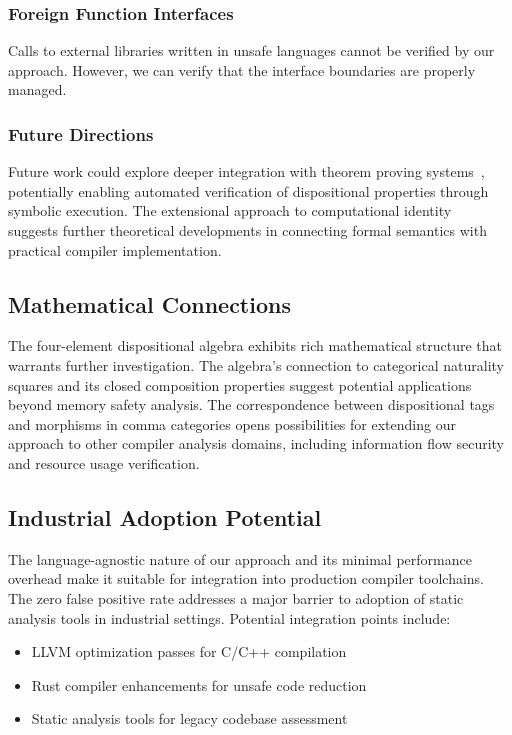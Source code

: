 \documentclass[acmsmall,anonymous,review,screen]{acmart}
\begin{document}
	\subsubsection{Foreign Function Interfaces}
	Calls to external libraries written in unsafe languages cannot be verified by our approach. However, we can verify that the interface boundaries are properly managed.
	
	\subsubsection{Future Directions}
	Future work could explore deeper integration with theorem proving systems~\cite{detlefs2005simplify}, potentially enabling automated verification of dispositional properties through symbolic execution. The extensional approach to computational identity~\cite{quine1961word} suggests further theoretical developments in connecting formal semantics with practical compiler implementation.
	
	\subsection{Mathematical Connections}
	
	The four-element dispositional algebra exhibits rich mathematical structure that warrants further investigation. The algebra's connection to categorical naturality squares and its closed composition properties suggest potential applications beyond memory safety analysis. The correspondence between dispositional tags and morphisms in comma categories opens possibilities for extending our approach to other compiler analysis domains, including information flow security and resource usage verification.
	
	\subsection{Industrial Adoption Potential}
	
	The language-agnostic nature of our approach and its minimal performance overhead make it suitable for integration into production compiler toolchains. The zero false positive rate addresses a major barrier to adoption of static analysis tools in industrial settings. Potential integration points include:
	\begin{itemize}
		\item LLVM optimization passes for C/C++ compilation
		\item Rust compiler enhancements for unsafe code reduction
		\item Static analysis tools for legacy codebase assessment
	\end{itemize}
	
\end{document}
